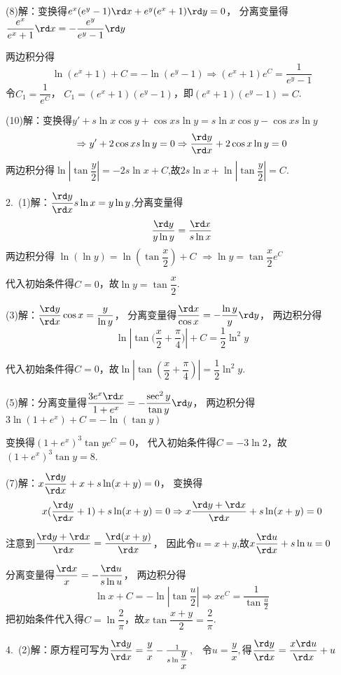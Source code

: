   (8)解：变换得$e^x(e^y-1)\rd x+e^y(e^x+1)\rd y=0$，
  分离变量得$\dfrac{e^x}{e^x+1}\rd x=-\dfrac{e^y}{e^y-1}\rd y$

  两边积分得
  $$\ln (e^x+1)+C =- \ln (e^y-1) \Rightarrow (e^x+1)e^C =\dfrac{1}{e^y-1}$$
  令$C_1=\dfrac{1}{e^C}$，
  $C_1=(e^x+1)(e^y-1)$，即$(e^x+1)(e^y-1)=C$.

  (10)解：变换得$y'+s \ln x \cos y + \cos x s \ln y =s \ln x \cos y - \cos x s \ln y$
  $$\Rightarrow y'+2\cos x s \ln y =0 \Rightarrow \dfrac{\rd y}{\rd x}+2\cos x \ln y=0$$
  两边积分得$ \ln \left| {\tan \dfrac{y}{2}} \right|=-2s \ln x+C$,故$2s \ln x+ \ln \left| {\tan \dfrac{y}{2}} \right|=C$.

  2.~(1)解：$\dfrac{\rd y}{\rd x}s \ln x=y \ln y$,分离变量得
  $$\dfrac{\rd y}{y \ln y}=\dfrac{\rd x}{s \ln x}$$
  两边积分得
  $\ln(\ln y) =\ln(\tan\dfrac{x}{2})+C$
  $\Rightarrow \ln y =\tan\dfrac{x}{2}e^C$

  代入初始条件得$C=0$，故$\ln y=\tan\dfrac{x}{2}$.

  (3)解：$\dfrac{\rd y}{\rd x}\cos x=\dfrac{y}{ \ln y}$，
  分离变量得$\dfrac{\rd x}{\cos x}=-\dfrac{ \ln y}{y}\rd y$，
  两边积分得
  $$\ln \left| {\tan (\dfrac{x}{2}+\frac{\pi }{4}}) \right|+C=\dfrac{1}{2} \ln ^2y$$

  代入初始条件得$C=0$，故$ \ln \left| \tan \left(\dfrac{x}{2}+\dfrac{\pi }{4}\right) \right|=\dfrac{1}{2} \ln ^2y$.

  (5)解：分离变量得$\dfrac{3e^x\rd x}{1+e^x}=-\dfrac{\sec^2y}{ \tan y }\rd y$，
  两边积分得$3 \ln (1+e^x)+C=- \ln ( \tan y )$

  变换得$(1+e^x)^3 \tan y e^C=0$，
  代入初始条件得$C=-3 \ln 2$，故$(1+e^x)^3 \tan y =8$.

  (7)解：$x\dfrac{\rd y}{\rd x}+x+s \ln (x+y) = 0$，
  变换得
  $$x(\dfrac{\rd y}{\rd x}+1)+s \ln (x+y) = 0 \Rightarrow x\dfrac{\rd y+\rd x}{\rd x}+s \ln (x+y)=0$$

  注意到$\dfrac{\rd y+\rd x}{\rd x}=\dfrac{\rd (x+y)}{\rd x}$，
  因此令$u=x+y$,故$x\dfrac{\rd u}{\rd x}+s \ln u=0$

  分离变量得$\dfrac{\rd x}{x}=-\dfrac{\rd u}{s \ln u}$，
  两边积分得
  $$\ln x+C=- \ln \left| {\tan \dfrac{u}{2}} \right|\Rightarrow xe^C=\dfrac{1}{\tan \frac{u}{2}}$$
  把初始条件代入得$C= \ln \dfrac{2}{\pi }$，故$x\tan\dfrac{x+y}{2}=\dfrac{2}{\pi }$.

  4.~(2)解：原方程可写为$\dfrac{\rd y}{\rd x}=\dfrac{y}{x}-\frac{1}{s \ln \dfrac{y}{x}}$,~~令$u=\dfrac{y}{x},$得$\dfrac{\rd y}{\rd x}=\dfrac{x\rd u}{\rd x}+u$

